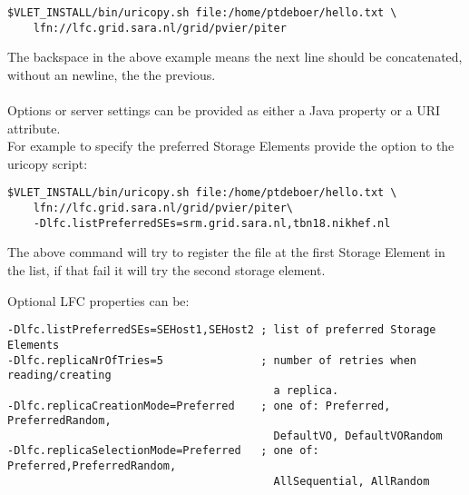 \hspace*{10mm}\begin{minipage}{170mm}
\begin{verbatim}
$VLET_INSTALL/bin/uricopy.sh file:/home/ptdeboer/hello.txt \
	lfn://lfc.grid.sara.nl/grid/pvier/piter
\end{verbatim}
\end{minipage}

The backspace in the above example means the next line should be concatenated,
without an newline, the the previous. \\
\\
Options or server settings can be provided as either a Java property or a URI
attribute. \\
For example to specify the preferred Storage Elements provide the
\Emph{lfc.listPreferredSEs} option to the uricopy script:\\

\hspace*{10mm}\begin{minipage}{170mm}
\begin{verbatim}
$VLET_INSTALL/bin/uricopy.sh file:/home/ptdeboer/hello.txt \
	lfn://lfc.grid.sara.nl/grid/pvier/piter\
	-Dlfc.listPreferredSEs=srm.grid.sara.nl,tbn18.nikhef.nl
\end{verbatim}
\end{minipage}

The above command will try to register the file at the first Storage Element in
the list, if that fail it will try the second storage element. 

Optional LFC properties can be: \\

\hspace*{10mm}\begin{minipage}{170mm}
\begin{verbatim}
-Dlfc.listPreferredSEs=SEHost1,SEHost2 ; list of preferred Storage Elements
-Dlfc.replicaNrOfTries=5               ; number of retries when reading/creating
                                         a replica. 
-Dlfc.replicaCreationMode=Preferred    ; one of: Preferred, PreferredRandom,
                                         DefaultVO, DefaultVORandom 
-Dlfc.replicaSelectionMode=Preferred   ; one of: Preferred,PreferredRandom,
                                         AllSequential, AllRandom
\end{verbatim}
\end{minipage}\\



